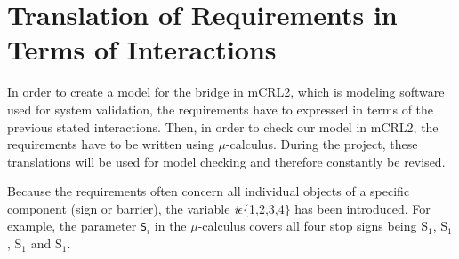 \section{Translation of Requirements in Terms of Interactions}
\label{sec:trans}

In order to create a model for the bridge in mCRL2, which is modeling software used for system validation, the requirements have to expressed in terms of the previous stated interactions. Then, in order to check our model in mCRL2, the requirements have to be written using $\mu$-calculus. During the project, these translations will be used for model checking and therefore constantly be revised.

Because the requirements often concern all individual objects of a specific component (sign or barrier), the variable \emph{i}$\epsilon \{$1,2,3,4$\}$ has been introduced. For example, the parameter \texttt{S$_i$} in the $\mu$-calculus covers all four stop signs being S$_1$, S$_1$, S$_1$ and S$_1$.
%
